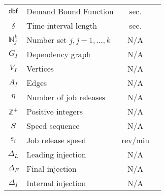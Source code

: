\begin{center}
{\begin{tabular}{| c | l | c | c |}
    $\mbox{\sf dbf}$ & Demand Bound Function & sec. \\ \cline{1-3}
    $\delta$ & Time interval length & sec. \\ \cline{1-3}
    $\mathbb{N}_j^k$ & Number set ${j, j+1, ... , k}$& N/A \\ \cline{1-3}
    $G_I$ & Dependency graph & N/A \\ \cline{1-3}
    $V_I$ & Vertices & N/A \\ \cline{1-3}
    $A_I$ & Edges & N/A \\ \cline{1-3}
    $\eta$ & Number of job releases & N/A \\ \cline{1-3}
    $\mathbb{Z}^+$ & Positive integers & N/A \\ \cline{1-3}
    $S$ & Speed sequence & N/A \\ \cline{1-3}
    $s_i$ & Job release speed & rev/min \\ \cline{1-3}
    $\Delta_L$ & Leading injection & N/A \\ \cline{1-3}
    $\Delta_F$ & Final injection & N/A \\ \cline{1-3}
    $\Delta_I$ & Internal injection & N/A \\ \cline{1-3}
    \hline  
\end{tabular}}
\egroup
\end{center}